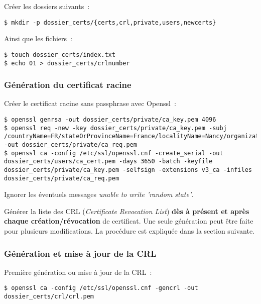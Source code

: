 Créer les dossiers suivants~:

\begin{lstlisting}
$ mkdir -p dossier_certs/{certs,crl,private,users,newcerts}
\end{lstlisting}

Ainsi que les fichiers~:

\begin{lstlisting}
$ touch dossier_certs/index.txt
$ echo 01 > dossier_certs/crlnumber
\end{lstlisting}

\subsubsection{Génération du certificat racine}

Créer le certificat racine sans passphrase avec Openssl~:

\begin{lstlisting}
$ openssl genrsa -out dossier_certs/private/ca_key.pem 4096 
$ openssl req -new -key dossier_certs/private/ca_key.pem -subj /countryName=FR/stateOrProvinceName=France/localityName=Nancy/organizationName=BHConsulting/commonName=nom_entreprise/ -out dossier_certs/private/ca_req.pem
$ openssl ca -config /etc/ssl/openssl.cnf -create_serial -out dossier_certs/users/ca_cert.pem -days 3650 -batch -keyfile dossier_certs/private/ca_key.pem -selfsign -extensions v3_ca -infiles dossier_certs/private/ca_req.pem
\end{lstlisting}

Ignorer les éventuels messages \og{}\emph{unable to write 'random state'}\fg.

Générer la liste des CRL (\emph{Certificate Revocation List}) \textbf{dès à présent et après chaque création/révocation} de certificat. Une seule génération peut être faite pour plusieurs modifications. La procédure est expliquée dans la section suivante.

\subsubsection{Génération et mise à jour de la CRL}
\label{gen-crl}

Première génération ou mise à jour de la CRL~:

\begin{lstlisting}
$ openssl ca -config /etc/ssl/openssl.cnf -gencrl -out dossier_certs/crl/crl.pem
\end{lstlisting}

